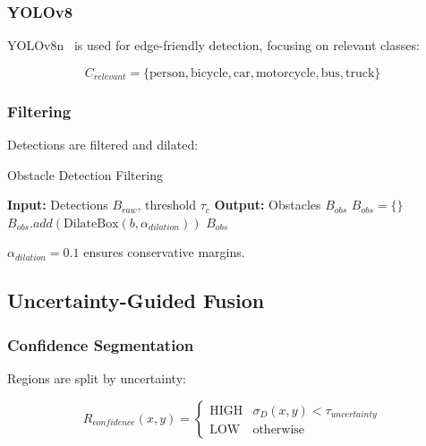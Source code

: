 \documentclass[12pt,oneside]{book}
\begin{document}
\subsubsection{YOLOv8}

YOLOv8n~\cite{jocher2023ultralytics} is used for edge-friendly detection, focusing on relevant classes:

\begin{equation}
C_{relevant} = \{\text{person}, \text{bicycle}, \text{car}, \text{motorcycle}, \text{bus}, \text{truck}\}
\label{eq:relevant_classes}
\end{equation}

\subsubsection{Filtering}

Detections are filtered and dilated:

\begin{algorithm}
\caption{Obstacle Detection Filtering}
\begin{algorithmic}
\STATE \textbf{Input:} Detections $B_{raw}$, threshold $\tau_c$
\STATE \textbf{Output:} Obstacles $B_{obs}$
\STATE $B_{obs} = \{\}$
        \STATE $B_{obs}.add(\text{DilateBox}(b, \alpha_{dilation}))$
    \ENDIF
\ENDFOR
\RETURN $B_{obs}$
\end{algorithmic}
\end{algorithm}

$\alpha_{dilation} = 0.1$ ensures conservative margins.

\subsection{Uncertainty-Guided Fusion}

\subsubsection{Confidence Segmentation}

Regions are split by uncertainty:

\begin{equation}
R_{confidence}(x,y) =
\begin{cases}
\text{HIGH} & \sigma_D(x,y) < \tau_{uncertainty} \\
\text{LOW} & \text{otherwise}
\end{cases}
\label{eq:confidence_segmentation}
\end{equation}
\end{document}
